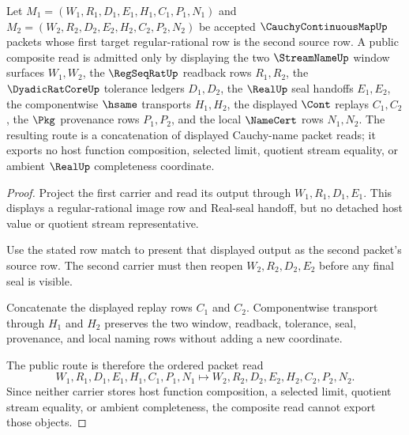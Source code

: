 \begin{theorem}
\label{thm:cauchy-continuous-map-composition-route}
Let $M_1=(W_1,R_1,D_1,E_1,H_1,C_1,P_1,N_1)$ and $M_2=(W_2,R_2,D_2,E_2,H_2,C_2,P_2,N_2)$ be accepted $\CauchyContinuousMapUp$ packets whose first target regular-rational row is the second source row. A public composite read is admitted only by displaying the two $\StreamNameUp$ window surfaces $W_1,W_2$, the $\RegSeqRatUp$ readback rows $R_1,R_2$, the $\DyadicRatCoreUp$ tolerance ledgers $D_1,D_2$, the $\RealUp$ seal handoffs $E_1,E_2$, the componentwise $\hsame$ transports $H_1,H_2$, the displayed $\Cont$ replays $C_1,C_2$, the $\Pkg$ provenance rows $P_1,P_2$, and the local $\NameCert$ rows $N_1,N_2$. The resulting route is a concatenation of displayed Cauchy-name packet reads; it exports no host function composition, selected limit, quotient stream equality, or ambient $\RealUp$ completeness coordinate.
\end{theorem}
\begin{proof}
Project the first carrier and read its output through $W_1,R_1,D_1,E_1$. This displays a regular-rational image row and Real-seal handoff, but no detached host value or quotient stream representative.

Use the stated row match to present that displayed output as the second packet's source row. The second carrier must then reopen $W_2,R_2,D_2,E_2$ before any final seal is visible.

Concatenate the displayed replay rows $C_1$ and $C_2$. Componentwise transport through $H_1$ and $H_2$ preserves the two window, readback, tolerance, seal, provenance, and local naming rows without adding a new coordinate.

The public route is therefore the ordered packet read
$$
W_1,R_1,D_1,E_1,H_1,C_1,P_1,N_1
\longmapsto
W_2,R_2,D_2,E_2,H_2,C_2,P_2,N_2 .
$$
Since neither carrier stores host function composition, a selected limit, quotient stream equality, or ambient completeness, the composite read cannot export those objects.
\end{proof}

